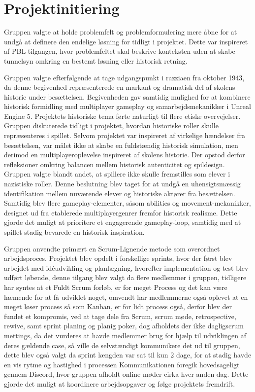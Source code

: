 \section{Projektinitiering}

Gruppen valgte at holde problemfelt og problemformulering mere åbne for at undgå at definere den endelige løsning for tidligt i projektet. Dette var inspireret af PBL-tilgangen, hvor problemfeltet skal beskrive konteksten uden at skabe tunnelsyn omkring en bestemt løsning eller historisk retning.

Gruppen valgte efterfølgende at tage udgangspunkt i razziaen fra oktober 1943, da denne begivenhed repræsenterede en markant og dramatisk del af skolens historie under besættelsen. Begivenheden gav samtidig mulighed for at kombinere historisk formidling med multiplayer gameplay og samarbejdsmekanikker i Unreal Engine 5. Projektets historiske tema førte naturligt til flere etiske overvejelser. Gruppen diskuterede tidligt i projektet, hvordan historiske roller skulle repræsenteres i spillet. Selvom projektet var inspireret af virkelige hændelser fra besættelsen, var målet ikke at skabe en fuldstændig historisk simulation, men derimod en multiplayeroplevelse inspireret af skolens historie. Der opstod derfor refleksioner omkring balancen mellem historisk autenticitet og spildesign. Gruppen valgte blandt andet, at spillere ikke skulle fremstilles som elever i nazistiske roller. Denne beslutning blev taget for at undgå en uhensigtsmæssig identifikation mellem nuværende elever og historiske aktører fra besættelsen. Samtidig blev flere gameplay-elementer, såsom abilities og movement-mekanikker, designet ud fra etablerede multiplayergenrer fremfor historisk realisme. Dette gjorde det muligt at prioritere et engagerende gameplay-loop, samtidig med at spillet stadig bevarede en historisk inspiration.

Gruppen anvendte primært en Scrum-Lignende metode som overordnet arbejdsproces. Projektet blev opdelt i forskellige sprints, hvor der først blev arbejdet med idéudvikling og planlægning, hvorefter implementation og test blev udført løbende, denne tilgang blev valgt da flere medlemmer i gruppen, tidligere har syntes at et Fuldt Scrum forløb, er for meget Process og det kan være hæmende for at få udviklet noget, omvendt har medlemmerne også oplevet at en meget løser process så som Kanban, er for lidt process også, derfor blev der fundet et kompromis, ved at tage dele fra Scrum, scrum møde, retrospective, rewive, samt sprint planing og planig poker, dog afholdets der ikke dagligscrum mettings, da det vurderes at havde medlemmer brug for hjælp til udviklingen af deres gældende case, så ville de selvstændigt kommunikere det ud til gruppen, dette blev også valgt da sprint længden var sat til kun 2 dage, for at stadig havde en vis rytme og hastighed i processen Kommunikationen foregik hovedsageligt gennem Discord, hvor gruppen afholdt online møder cirka hver anden dag. Dette gjorde det muligt at koordinere arbejdsopgaver og følge projektets fremdrift.